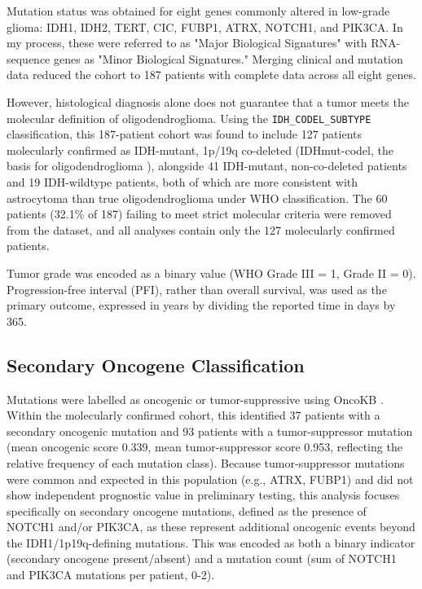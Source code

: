 \documentclass[11pt, letterpaper]{article}
\begin{document}
Mutation status was obtained for eight genes commonly altered in low-grade glioma: IDH1, IDH2, TERT, CIC, FUBP1, ATRX, NOTCH1, and PIK3CA. In my process, these were referred to as "Major Biological Signatures" with RNA-sequence genes as "Minor Biological Signatures." Merging clinical and mutation data reduced the cohort to 187 patients with complete data across all eight genes.

However, histological diagnosis alone does not guarantee that a tumor meets the molecular definition of oligodendroglioma. Using the \texttt{IDH\_CODEL\_SUBTYPE} classification, this 187-patient cohort was found to include 127 patients molecularly confirmed as IDH-mutant, 1p/19q co-deleted (IDHmut-codel, the basis for oligodendroglioma \cite{WHO2021}), alongside 41 IDH-mutant, non-co-deleted patients and 19 IDH-wildtype patients, both of which are more consistent with astrocytoma than true oligodendroglioma under WHO classification. The 60 patients (32.1\% of 187) failing to meet strict molecular criteria were removed from the dataset, and all analyses contain only the 127 molecularly confirmed patients.

Tumor grade was encoded as a binary value (WHO Grade III = 1, Grade II = 0). Progression-free interval (PFI), rather than overall survival, was used as the primary outcome, expressed in years by dividing the reported time in days by 365.

\subsection{Secondary Oncogene Classification}

Mutations were labelled as oncogenic or tumor-suppressive using OncoKB \cite{OncoKB2017}. Within the molecularly confirmed cohort, this identified 37 patients with a secondary oncogenic mutation and 93 patients with a tumor-suppressor mutation (mean oncogenic score 0.339, mean tumor-suppressor score 0.953, reflecting the relative frequency of each mutation class). Because tumor-suppressor mutations were common and expected in this population (e.g., ATRX, FUBP1) and did not show independent prognostic value in preliminary testing, this analysis focuses specifically on secondary oncogene mutations, defined as the presence of NOTCH1 and/or PIK3CA, as these represent additional oncogenic events beyond the IDH1/1p19q-defining mutations. This was encoded as both a binary indicator (secondary oncogene present/absent) and a mutation  count (sum of NOTCH1 and PIK3CA mutations per patient, 0-2).
\end{document}
